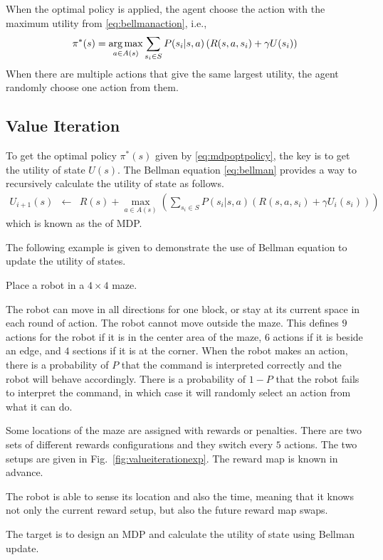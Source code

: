 When the optimal policy is applied, the agent choose the action with the maximum utility from \eqref{eq:bellmanaction}, i.e.,
\begin{eqnarray}
	\pi^*(s) = \operatorname*{arg\,max}_{a\in A(s)} \sum_{s_i \in S} P(s_i|s,a)\left(R(s,a,s_i) + \gamma U(s_i)\right) \label{eq:mdpoptpolicy}
\end{eqnarray}
When there are multiple actions that give the same largest utility, the agent randomly choose one action from them.

\subsection{Value Iteration} \label{sec:mdpvalue}

To get the optimal policy $\pi^*(s)$ given by \eqref{eq:mdpoptpolicy}, the key is to get the utility of state $U(s)$. The Bellman equation \eqref{eq:bellman} provides a way to recursively calculate the utility of state as follows.
\begin{eqnarray}
	U_{i+1}(s) &\leftarrow& R(s) + \max_{a\in A(s)}\left(\sum_{s_i \in S} P(s_i|s,a)\left(R(s,a,s_i) + \gamma U_i(s_i)\right)\right) \label{eq:bellmanupdate}
\end{eqnarray}
which is known as the  of MDP.

The following example is given to demonstrate the use of Bellman equation to update the utility of states.

\begin{shortbox}

Place a robot in a $4\times 4$ maze. 

The robot can move in all directions for one block, or stay at its current space in each round of action. The robot cannot move outside the maze. This defines $9$ actions for the robot if it is in the center area of the maze, $6$ actions if it is beside an edge, and $4$ sections if it is at the corner. When the robot makes an action, there is a probability of $P$ that the command is interpreted correctly and the robot will behave accordingly. There is a probability of $1-P$ that the robot fails to interpret the command, in which case it will randomly select an action from what it can do.

Some locations of the maze are assigned with rewards or penalties. There are two sets of different rewards configurations and they switch every $5$ actions. The two setups are given in Fig.~\ref{fig:valueiterationexp}. The reward map is known in advance.

The robot is able to sense its location and also the time, meaning that it knows not only the current reward setup, but also the future reward map swaps.

The target is to design an MDP and calculate the utility of state using Bellman update. 

\end{shortbox}

